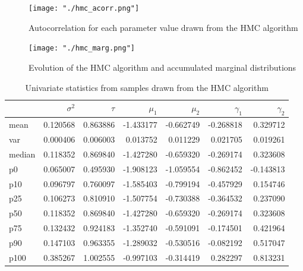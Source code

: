 \documentclass{article}
\begin{document}
\begin{figure}[H]
  \centering
  \texttt{[image: "./hmc\_acorr.png"]}
  \caption{\label{fig:hmc_acorr} Autocorrelation for each parameter value drawn from the HMC algorithm}
\end{figure}

\begin{figure}[H]
  \centering
  \texttt{[image: "./hmc\_marg.png"]}
  \caption{\label{fig:hmc_marg} Evolution of the HMC algorithm and accumulated marginal distributions}
\end{figure}

\begin{table}[H]
  \begin{center}
    \begin{tabular}{lrrrrrr}
      &$\sigma^2$ & $\tau$ & $\mu_1$ & $\mu_2$ & $\gamma_1$ & $\gamma_2$ \\
      \midrule
      mean   &  0.120568 &  0.863886 & -1.433177 & -0.662749 & -0.268818 &  0.329712 \\
      var    &  0.000406 &  0.006003 &  0.013752 &  0.011229 &  0.021705 &  0.019261 \\
      median &  0.118352 &  0.869840 & -1.427280 & -0.659320 & -0.269174 &  0.323608 \\
      p0     &  0.065007 &  0.495930 & -1.908123 & -1.059554 & -0.862452 & -0.143813 \\
      p10    &  0.096797 &  0.760097 & -1.585403 & -0.799194 & -0.457929 &  0.154746 \\
      p25    &  0.106273 &  0.810910 & -1.507754 & -0.730388 & -0.364532 &  0.237090 \\
      p50    &  0.118352 &  0.869840 & -1.427280 & -0.659320 & -0.269174 &  0.323608 \\
      p75    &  0.132432 &  0.924183 & -1.352740 & -0.591091 & -0.174501 &  0.421964 \\
      p90    &  0.147103 &  0.963355 & -1.289032 & -0.530516 & -0.082192 &  0.517047 \\
      p100   &  0.385267 &  1.002555 & -0.997103 & -0.314419 &  0.282297 &  0.813231 \\
      \bottomrule
      \end{tabular}
  \end{center}
  \caption{\label{tab:hmc_univar} Univariate statistics from samples drawn from the HMC algorithm}
\end{table}
\end{document}
